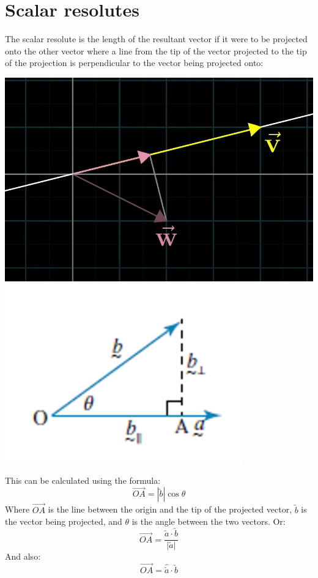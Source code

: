 \documentclass{book}
\begin{document}
\section{Scalar resolutes}
The scalar resolute is the length of the resultant vector if it were to be projected onto the other vector where a line from the tip of the vector projected to the tip of the projection is perpendicular to the vector being projected onto:
\begin{center}
	\includegraphics[scale=0.5]{dot product explination}
	\includegraphics[scale=0.5]{dot product explination 2}
\end{center}
This can be calculated using the formula:
\[
	\Vec{OA} = |\utilde{b}|\cos\theta
\]
Where $\Vec{OA}$ is the line between the origin and the tip of the projected vector, $\utilde{b}$ is the vector being projected, and $\theta$ is the angle between the two vectors.  Or:
\[
	\Vec{OA} = \frac{\utilde{a} \cdot \utilde{b}}{|\utilde{a}|}
\]
And also:
\[
	\Vec{OA} = \hat{\utilde{a}} \cdot \utilde{b}
\]
\end{document}
